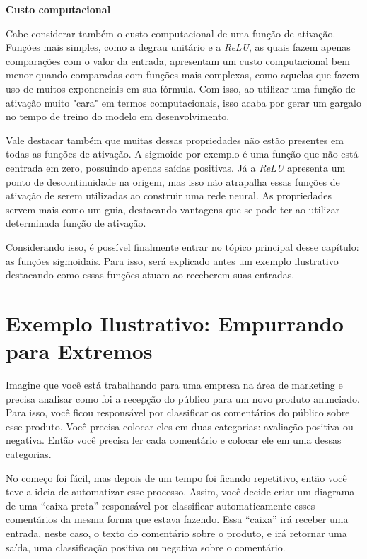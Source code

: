 \textbf{Custo computacional}

Cabe considerar também o custo computacional de uma função de ativação. Funções mais simples, como a degrau unitário e a \textit{ReLU}, as quais fazem apenas comparações com o valor da entrada, apresentam um custo computacional bem menor quando comparadas com funções mais complexas, como aquelas que fazem uso de muitos exponenciais em sua fórmula. Com isso, ao utilizar uma função de ativação muito "cara" em termos computacionais, isso acaba por gerar um gargalo no tempo de treino do modelo em desenvolvimento.

Vale destacar também que muitas dessas propriedades não estão presentes em todas as funções de ativação. A sigmoide por exemplo é uma função que não está centrada em zero, possuindo apenas saídas positivas. Já a \textit{ReLU} apresenta um ponto de descontinuidade na origem, mas isso não atrapalha essas funções de ativação de serem utilizadas ao construir uma rede neural. As propriedades servem mais como um guia, destacando vantagens que se pode ter ao utilizar determinada função de ativação.

Considerando isso, é possível finalmente entrar no tópico principal desse capítulo: as funções sigmoidais. Para isso, será explicado antes um exemplo ilustrativo destacando como essas funções atuam ao receberem suas entradas.

\section{Exemplo Ilustrativo: Empurrando para Extremos}

Imagine que você está trabalhando para uma empresa na área de marketing e precisa analisar como foi a recepção do público para um novo produto anunciado. Para isso, você ficou responsável por classificar os comentários do público sobre esse produto. Você precisa colocar eles em duas categorias: avaliação positiva ou negativa. Então você precisa ler cada comentário e colocar ele em uma dessas categorias. 

No começo foi fácil, mas depois de um tempo foi ficando repetitivo, então você teve a ideia de automatizar esse processo. Assim, você decide criar um diagrama de uma “caixa-preta” responsável por classificar automaticamente esses comentários da mesma forma que estava fazendo. Essa “caixa” irá receber uma entrada, neste caso, o texto do comentário sobre o produto, e irá retornar uma saída, uma classificação positiva ou negativa sobre o comentário. 

